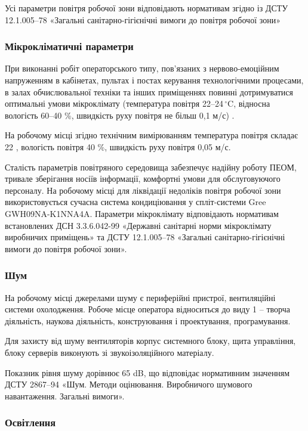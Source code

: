 \documentclass[a4paper,ukrainian,utf8,nocolumnsxix,floatsection,equationsection]{eskdtext}
\renewcommand\paragraph{\subsubsection}
\begin{document}
Усі параметри повітря робочої зони відповідають нормативам згідно із  ДСТУ 12.1.005–78 «Загальні санітарно-гігієнічні вимоги до повітря робочої зони»

\paragraph{Мікрокліматичні параметри}

При виконанні робіт операторського типу, пов'язаних з нервово-емоційним напруженням в кабінетах, пультах і постах керування технологічними процесами, в залах обчислювальної техніки та інших приміщеннях повинні дотримуватися оптимальні умови мікроклімату (температура повітря 22–24$\,^{\circ}\mathrm{C}$, відносна вологість 60–40 \%, швидкість руху повітря не більш 0,1 м/с) \cite{work:safety:17}.

На робочому місці згідно технічним вимірюванням температура повітря складає 22 , вологість повітря 40 \%, швидкість руху повітря 0,05 м/с.

Сталість параметрів повітряного середовища забезпечує надійну роботу ПЕОМ, тривале зберігання носіїв інформації, комфортні умови для обслуговуючого персоналу. На робочому місці для ліквідації недоліків повітря робочої зони використовується сучасна система кондиціювання у спліт-системи Gree GWH09NA-K1NNA4A. Параметри мікроклімату відповідають нормативам встановлених ДСН 3.3.6.042-99 «Державні санітарні норми мікроклімату виробничих приміщень» та ДСТУ 12.1.005–78 «Загальні санітарно-гігієнічні вимоги до повітря робочої зони».

\paragraph{Шум}

На робочому місці джерелами шуму є периферійні пристрої, вентиляційні системи охолодження. Робоче місце оператора відноситься до виду 1 – творча діяльність, наукова діяльність, конструювання і проектування, програмування.

Для захисту від шуму вентиляторів корпус системного блоку, щита управління, блоку серверів виконують зі звукоізоляційного матеріалу. 

Показник рівня шуму дорівнює 65 dB, що відповідає нормативним значенням ДСТУ 2867–94 «Шум. Методи оцінювання. Виробничого шумового навантаження. Загальні вимоги».

\paragraph{Освітлення}
\end{document}
